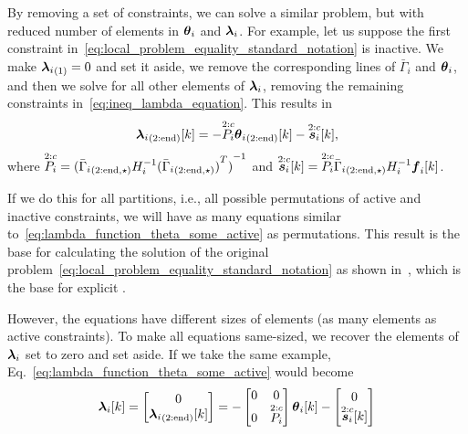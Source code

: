 \documentclass[../main.tex]{subfiles}
\begin{document}
By removing a set of constraints, we can solve a similar problem, but with reduced number of elements in $\thetai$ and $\lambdai$.
For example, let us suppose the first constraint in~\eqref{eq:local_problem_equality_standard_notation} is inactive.
We make $\elem[1]{\lambdai}=0$ and set it aside, we remove the corresponding lines of $\bar{\Gamma}_{i}$ and $\thetai$, and then we solve for all other elements of $\lambdai$, removing the remaining constraints in~\eqref{eq:ineq_lambda_equation}. This results in
\begin{equation}
  \label{eq:lambda_function_theta_some_active}
  \elem[2:\elemend]{\lambdai}[k]=-\Plinineqnonzero[2:c] \elem[2:\elemend]{\thetai}[k]-\sikineqnonzero[2:c],
\end{equation}
where $\Plinineqnonzero[2:c]={(\linearcoefiineqnonzero[2:\elemend,\star])}^{-1}$ and $\sikineqnonzero[2:c]=\Plinineqnonzero[2:c]\elem[2:\elemend,\star]{\bar{\Gamma}_{i}}H_{i}^{-1}\vec{f}_{i}[k]$.

If we do this for all partitions, i.e., all possible permutations of active and inactive constraints, we will have as many equations similar to~\eqref{eq:lambda_function_theta_some_active} as permutations.
This result is the base for calculating the solution of the original problem~\eqref{eq:local_problem_equality_standard_notation} as shown in~\cite{BemporadEtAl2002,AlessioBemporad2009}, which is the base for explicit \mpc{}.

However, the equations have different sizes of elements (as many elements as active constraints).
To make all equations same-sized, we recover the elements of $\lambdai$ set to zero and set aside.
If we take the same example, Eq.~\eqref{eq:lambda_function_theta_some_active} would become
\begin{equation}
  \label{eq:lambda_function_theta_some_active_same_size}
  \lambdaik=
  \left[
    \begin{matrix}
      0\\
      \elem[2:\elemend]{\lambdai}[k]
    \end{matrix}
  \right]
  =
  -
  \left[
    \begin{matrix}
      0&0\\
      0&\Plinineqnonzero[2:c]
    \end{matrix}
  \right]
  \thetaik
  -
  \left[
    \begin{matrix}
      0\\
      \sikineqnonzero[2:c]
    \end{matrix}
  \right]
\end{equation}
\end{document}
